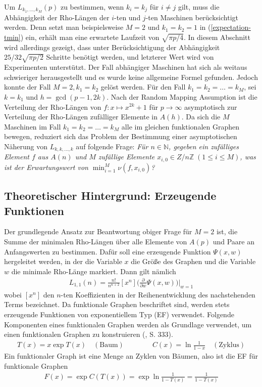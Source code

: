 \documentclass[a4paper, 10pt, ngerman]{article}
\newcommand{\N}{\mathbb{N}}
\newcommand{\Z}{\mathbb{Z}}
\begin{document}
Um $L_{k_1, \dots, k_M}(p)$ zu bestimmen, wenn $k_i = k_j$ für $i \ne j$ gilt, muss die Abhängigkeit der Rho-Längen der $i$-ten und $j$-ten Maschinen berücksichtigt werden. Denn setzt man beispielsweise $M = 2$ und $k_1 = k_2 = 1$ in (\ref{expectation-tmin}) ein, erhält man eine erwartete Laufzeit von $\sqrt {\pi p / 4}$. In diesem Abschnitt wird allerdings gezeigt, dass unter Berücksichtigung der Abhängigkeit $25/32 \sqrt{\pi p / 2}$ Schritte benötigt werden, und letzterer Wert wird von Experimenten unterstützt. Der Fall abhängiger Maschinen hat sich als weitaus schwieriger herausgestellt und es wurde keine allgemeine Formel gefunden. Jedoch konnte der Fall $M = 2, k_1 = k_2$ gelöst werden. Für den Fall $k_1 = k_2 = \dots = k_M$, sei $k = k_1$ und $h = \gcd(p - 1, 2k)$. Nach der Random Mapping Assumption ist die Verteilung der Rho-Längen von $f : x \mapsto x^{2k} + 1$ für $p \to \infty$ asymptotisch zur Verteilung der Rho-Längen zufälliger Elemente in $A(h)$. Da sich die $M$ Maschinen im Fall $k_1 = k_2 = \dots = k_M$ alle im gleichen funktionalen Graphen bewegen, reduziert sich das Problem der Bestimmung einer asymptotischen Näherung von $L_{k, k, \dots, k}$ auf folgende Frage: \emph{Für $n \in \N$, gegeben ein zufälliges Element $f$ aus $A(n)$ und $M$ zufällige Elemente $x_{i, 0} \in Z/n\Z \; (1 \le i \le M)$, was ist der Erwartungswert von $\min_{i = 1}^M \nu(f, x_{i, 0})$?}

\subsection{Theoretischer Hintergrund: Erzeugende Funktionen}

Der grundlegende Ansatz zur Beantwortung obiger Frage für $M = 2$ ist, die Summe der minimalen Rho-Längen über alle Elemente von $A(p)$ und Paare an Anfangswerten zu bestimmen. Dafür soll eine erzeugende Funktion $\Psi(x, w)$ hergeleitet werden, in der die Variable $x$ die Größe des Graphen und die Variable $w$ die minimale Rho-Länge markiert. Dann gilt nämlich
\begin{align*}
    L_{1, 1}(n) = \frac {n!}{n^{n + 2}} [x^n] \Bigg (\frac {\partial} {\partial w} \Psi(x, w) \Bigg ) \Bigg \vert_{w = 1}
\end{align*}
wobei $[x^n]$ den $n$-ten Koeffizienten in der Reihenentwicklung des nachstehenden Terms bezeichnet. Da funktionale Graphen beschriftet sind, werden stets erzeugende Funktionen von exponentiellem Typ (EF) verwendet. Folgende Komponenten eines funktionalen Graphen werden als Grundlage verwendet, um einen funktionalen Graphen zu konstruieren (\cite{fo90}, S. 333).
\begin{align*}
    T(x) = x \exp T(x) \quad (\text{Baum}) \qquad\qquad C(x) = \ln \frac {1} {1 - x} \quad (\text{Zyklus})
\end{align*}
Ein funktionaler Graph ist eine Menge an Zyklen von Bäumen, also ist die EF für funktionale Graphen
\begin{align*}
    F(x) = \exp C(T(x)) = \exp \ln \frac 1 {1 - T(x)} = \frac 1 {1 - T(x)}
\end{align*}
\end{document}
